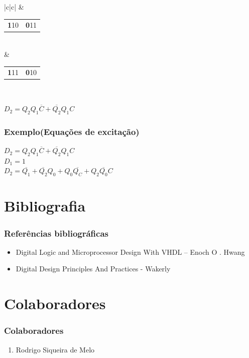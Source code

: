 \documentclass{beamer}
\begin{document}
\begin{frame}
\begin{center}
\begin{tabular}{|c|c|}
	    & \begin{tabular}{c|c} \textbf{1}10  & \textbf{0}11 \\ \end{tabular} \\
	    & \begin{tabular}{c|c} \textbf{1}11  & \textbf{0}10 \\ \end{tabular} \\
	  \hline
	\end{tabular}
      \end{center} 
      $D_2 = Q_2Q_1\overline{C} + \overline{Q_2}Q_1C$ 
\end{frame}

\begin{frame}
 \frametitle{Exemplo(Equações de excitação)} 
     $D_2 = Q_2Q_1\overline{C} + \overline{Q_2}Q_1C$  \\
     $D_1 = 1$ \\
     $D_2 = \overline{Q_1} + \overline{Q_2}Q_0 + Q_0\overline{Q_C} + Q_2\overline{Q_0}C$
\end{frame}

\section{Bibliografia}
\begin{frame}
 \frametitle{Referências bibliográficas}
 \begin{itemize}
  \item Digital Logic and Microprocessor Design With VHDL – Enoch O . Hwang
  \item Digital Design Principles And Practices - Wakerly
 \end{itemize}
\end{frame}

\section{Colaboradores}
\begin{frame}
 \frametitle{Colaboradores}
 \begin{enumerate}
  \item Rodrigo Siqueira de Melo
 \end{enumerate}
\end{frame}
\end{document}
